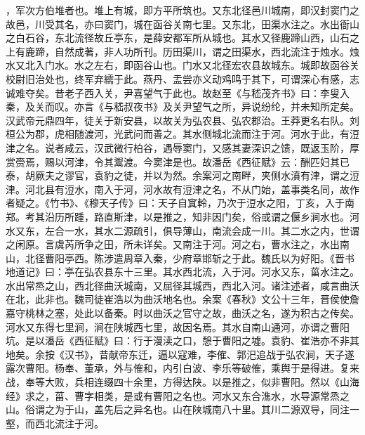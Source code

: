 \documentclass[12pt,UTF8]{ctexbook}
\begin{document}
，军次方伯堆者也。堆上有城，即方平所筑也。又东北径邑川城南，即汉封窦门之故邑，川受其名，亦曰窦门，城在函谷关南七里。又东北，田渠水注之。水出衙山之白石谷，东北流径故丘亭东，是薛安都军所从城也。其水又径鹿蹄山西，山石之上有鹿蹄，自然成著，非人功所刊。历田渠川，谓之田渠水，西北流注于烛水。烛水又北入门水。水之左右，即函谷山也。门水又北径宏农县故城东。城即故函谷关校尉旧治处也，终军弃繻于此。燕丹、盂尝亦义动鸡鸣于其下，可谓深心有感，志诚难夺矣。昔老子西入关，尹喜望气于此也。故赵至《与嵇茂齐书》曰：李叟入秦，及关而叹。亦言《与嵇叔夜书》及关尹望气之所，异说纷纶，并未知所定矣。汉武帝元鼎四年，徒关于新安县，以故关为弘农县、弘农郡治。王莽更名右队。刘桓公为郡，虎相随渡河，光武问而善之。其水侧城北流而注于河。河水于此，有浢津之名。说者咸云，汉武微行柏谷，遇辱窦门，又感其妻深识之馈，既返玉阶，厚赏赍焉，赐以河津，令其鬻渡。今窦津是也。故潘岳《西征赋》云：酬匹妇其已泰，胡厥夫之谬官，袁豹之徒，并以为然。余案河之南畔，夹侧水濆有津，谓之浢津。河北县有浢水，南入于河，河水故有浢津之名，不从门始，盖事类名同，故作者疑之。《竹书》、《穆天子传》曰：天子自窴軨，乃次于浢水之阳，丁亥，入于南郑。考其沿历所踵，路直斯津，以是推之，知非因门矣，俗或谓之偃乡涧水也。河水又东，左合一水，其水二源疏引，俱导薄山，南流会成一川。其二水之内，世谓之闲原。言虞芮所争之田，所未详矣。又南注于河。河之右，曹水注之，水出南山，北径曹阳亭西。陈涉遣周章入秦，少府章邯斩之于此。魏氏以为好阳。《晋书地道记》曰：亭在弘农县东十三里。其水西北流，入于河。河水又东，菑水注之。水出常烝之山，西北径曲沃城南，又屈径其城西，西北入河。诸注述者，咸言曲沃在北，此非也。魏司徒崔浩以为曲沃地名也。余案《春秋》文公十三年，晋侯使詹嘉守桃林之塞，处此以备秦。时以曲沃之官守之故，曲沃之名，遂为积古之传矣。河水又东得七里涧，涧在陕城西七里，故因名焉。其水自南山通河，亦谓之曹阳坑。是以潘岳《西征赋》曰：行于漫渎之口，憩于曹阳之墟。袁豹、崔浩亦不非其地矣。余按《汉书》，昔献帝东迁，逼以寇难，李傕、郭汜追战于弘农涧，天子遂露次曹阳。杨奉、董承，外与傕和，内引白波、李乐等破傕，乘舆于是得进。复来战，奉等大败，兵相连缀四十余里，方得达陕。以是推之，似非曹阳。然以《山海经》求之，菑、曹字相类，是或有曹阳之名也。河水又东合潐水，水导源常烝之山。俗谓之为于山，盖先后之异名也。山在陕城南八十里。其川二源双导，同注一壑，而西北流注于河。
\end{document}
